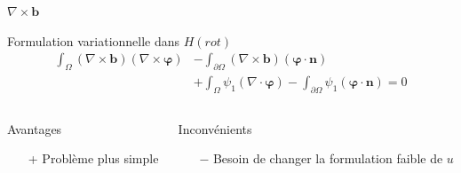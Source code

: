 \documentclass{beamer}
\newcommand{\rot}{{\nabla\times}}
\renewcommand{\div}{{\nabla\cdot}}
\begin{document}
\begin{frame}{$\rot \mathbf{b}$}
\begin{block}{Formulation variationnelle dans $ H(rot)$}
\begin{align*}
\int_\Omega (\rot \mathbf{b})(\rot\bm{\varphi}) &- \int_{\partial\Omega} (\rot \mathbf{b})(\bm{\varphi}\cdot \mathbf{n}) \\
&+\int_\Omega \psi_1(\div\bm{\varphi}) - \int_{\partial\Omega} \psi_1(\bm{\varphi}\cdot \mathbf{n}) = 0
\end{align*}
\end{block}
\begin{columns}[t]
\begin{column}{5cm}
\begin{exampleblock}{Avantages}
\begin{itemize}
\item[+] Problème plus simple
\end{itemize}
\end{exampleblock}
\end{column}
\begin{column}{5cm}
\begin{alertblock}{Inconvénients}
\begin{itemize}
\item[$-$] Besoin de changer la formulation faible de $u$
\end{itemize}
\end{alertblock}
\end{column}
\end{columns}
\end{frame}
\end{document}
